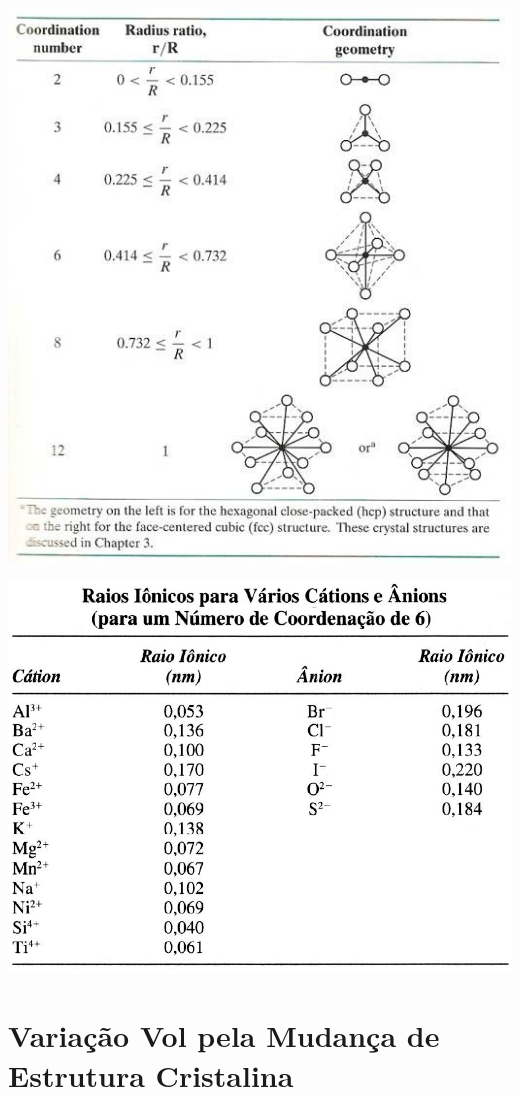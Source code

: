 \includegraphics[scale=0.3,trim={0 0 0 0}]{figures/RELraio}


\includegraphics[scale=0.2,trim={0 0 0 0}]{figures/raio}

\section{Variação Vol pela Mudança de Estrutura Cristalina}

